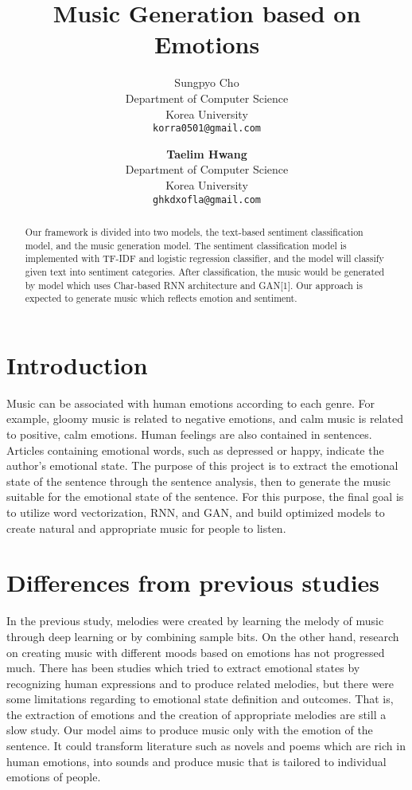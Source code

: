 \documentclass{article}
\title{Music Generation based on Emotions}
\author{
  Sungpyo Cho\\
  Department of Computer Science\\
  Korea University\\
  \texttt{korra0501@gmail.com}
  \and
  \textbf{Taelim Hwang}\\
  Department of Computer Science\\
  Korea University\\
  \texttt{ghkdxofla@gmail.com}
  }
\begin{document}

\maketitle

\begin{abstract}
    Our framework is divided into two models, the text-based sentiment classification model, and the music generation model. The sentiment classification model is implemented with TF-IDF and logistic regression classifier, and the model will classify given text into sentiment categories. After classification, the music would be generated by model which uses Char-based RNN architecture and GAN[1]. Our approach is expected to generate music which reflects emotion and sentiment.
\end{abstract}

\section{Introduction}

Music can be associated with human emotions according to each genre. For example, gloomy music is related to negative emotions, and calm music is related to positive, calm emotions. Human feelings are also contained in sentences. Articles containing emotional words, such as depressed or happy, indicate the author's emotional state. The purpose of this project is to extract the emotional state of the sentence through the sentence analysis, then to generate the music suitable for the emotional state of the sentence. For this purpose, the final goal is to utilize word vectorization, RNN, and GAN, and build optimized models to create natural and appropriate music for people to listen.

\section{Differences from previous studies}

In the previous study, melodies were created by learning the melody of music through deep learning or by combining sample bits. On the other hand, research on creating music with different moods based on emotions has not progressed much. There has been studies which tried to extract emotional states by recognizing human expressions and to produce related melodies, but there were some limitations regarding to emotional state definition and outcomes. That is, the extraction of emotions and the creation of appropriate melodies are still a slow study. Our model aims to produce music only with the emotion of the sentence. It could transform literature such as novels and poems which are rich in human emotions, into sounds and produce music that is tailored to individual emotions of people.
\end{document}
